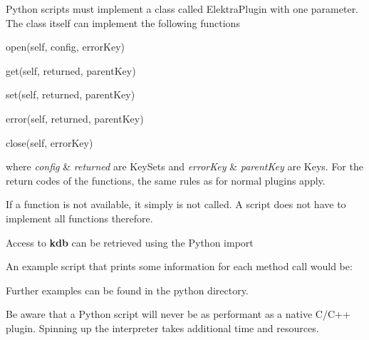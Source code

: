 Python scripts must implement a class called {\ttfamily Elektra\+Plugin} with one parameter. The class itself can implement the following functions


\begin{DoxyItemize}
\item open(self, config, error\+Key)
\item get(self, returned, parent\+Key)
\item set(self, returned, parent\+Key)
\item error(self, returned, parent\+Key)
\item close(self, error\+Key)
\end{DoxyItemize}

where {\itshape config} \& {\itshape returned} are Key\+Sets and {\itshape error\+Key} \& {\itshape parent\+Key} are Keys. For the return codes of the functions, the same rules as for normal plugins apply.

If a function is not available, it simply is not called. A script does not have to implement all functions therefore.

Access to {\bfseries{kdb}} can be retrieved using the Python import


\begin{DoxyCode}{0}
\end{DoxyCode}


An example script that prints some information for each method call would be\+:


\begin{DoxyCode}{0}
\DoxyCodeLine{}
\DoxyCodeLine{}
\DoxyCodeLine{}
\DoxyCodeLine{}
\end{DoxyCode}


Further examples can be found in the python directory.

Be aware that a Python script will never be as performant as a native C/\+C++ plugin. Spinning up the interpreter takes additional time and resources. 